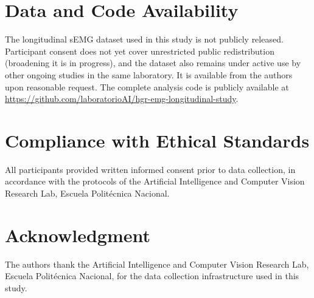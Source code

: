 \documentclass[journal]{IEEEtran}
\begin{document}
\section*{Data and Code Availability}
The longitudinal sEMG dataset used in this study is not publicly released. Participant consent does not yet cover unrestricted public redistribution (broadening it is in progress), and the dataset also remains under active use by other ongoing studies in the same laboratory. It is available from the authors upon reasonable request. The complete analysis code is publicly available at \url{https://github.com/laboratorioAI/hgr-emg-longitudinal-study}.

\section*{Compliance with Ethical Standards}
All participants provided written informed consent prior to data collection, in accordance with the protocols of the Artificial Intelligence and Computer Vision Research Lab, Escuela Polit\'ecnica Nacional.

\section*{Acknowledgment}
The authors thank the Artificial Intelligence and Computer Vision Research Lab, Escuela Polit\'ecnica Nacional, for the data collection infrastructure used in this study.



\end{document}
